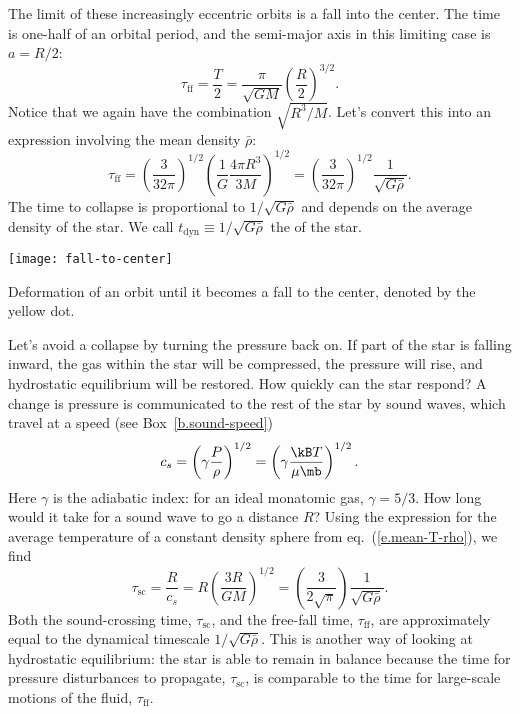 The limit of these increasingly eccentric orbits is a fall into the center.  The time is one-half of an orbital period, and the semi-major axis in this limiting case is $a = R/2$:
\[
\tau_{\mathrm{ff}} = \frac{T}{2} = \frac{\pi}{\sqrt{GM}} \left(\frac{R}{2}\right)^{3/2}.
\]
Notice that we again have the combination $\sqrt{R^{3}/M}$.  Let's convert this into an expression involving the mean density $\bar{\rho}$:
\begin{equation}\label{e.tff}
\tau_{\mathrm{ff}} = \left(\frac{3}{32\pi}\right)^{1/2}\left(\frac{1}{G}\frac{4\pi R^{3}}{3M}\right)^{1/2} = \left(\frac{3}{32\pi}\right)^{1/2} \frac{1}{\sqrt{G\bar{\rho}}}.
\end{equation}
The time to collapse is proportional to $1/\sqrt{G\bar{\rho}}$ and depends on the average density of the star. We call $t_{\mathrm{dyn}} \equiv 1/\sqrt{G\bar{\rho}}$ the  of the star.

\begin{marginfigure}
\texttt{[image: fall-to-center]}
\caption[Fall to center]{\label{f.fall-to-center} Deformation of an orbit until it becomes a fall to the center, denoted by the yellow dot.}
\end{marginfigure}

Let's avoid a collapse by turning the pressure back on.  If part of the star is falling inward, the gas within the star will be compressed, the pressure will rise, and hydrostatic equilibrium will be restored.  How quickly can the star respond? A change is pressure is communicated to the rest of the star by sound waves, which travel at a speed (see Box~\ref{b.sound-speed})
\begin{equation}\label{e.speed-of-sound}
c_{s} = \left(\gamma\frac{P}{\rho}\right)^{1/2}
	= \left(\gamma\frac{\kB T}{\mu\mb}\right)^{1/2}.
\end{equation}
Here $\gamma$ is the adiabatic index: for an ideal monatomic gas, $\gamma = 5/3$.  How long would it take for a sound wave to go a distance $R$?  Using the expression for the average temperature of a constant density sphere from eq.~(\ref{e.mean-T-rho}), we find
\[
	\tau_{\mathrm{sc}} = \frac{R}{c_{s}} = R\left(\frac{3R}{GM}\right)^{1/2}
		= \left(\frac{3}{2\sqrt{\pi}}\right)\frac{1}{\sqrt{G\bar{\rho}}}.
\]
Both the sound-crossing time, $\tau_{\mathrm{sc}}$, and the free-fall time, $\tau_{\mathrm{ff}}$, are approximately equal to the dynamical timescale $1/\sqrt{G\bar{\rho}}$.  This is another way of looking at hydrostatic equilibrium: the star is able to remain in balance because the time for pressure disturbances to propagate, $\tau_{\mathrm{sc}}$, is comparable to the time for large-scale motions of the fluid, $\tau_{\mathrm{ff}}$.

